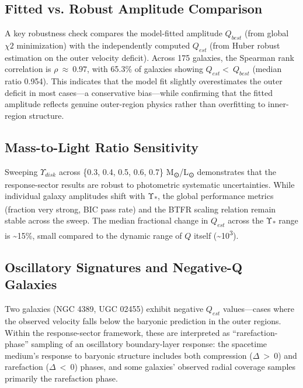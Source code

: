 \documentclass[11pt]{article}
\begin{document}
\subsection{Fitted vs. Robust Amplitude Comparison}\label{fitted-vs.-robust-amplitude-comparison}

A key robustness check compares the model-fitted amplitude \(Q_{best}\) (from global \(\chi 2\) minimization) with the independently computed \(Q_{est}\) (from Huber robust estimation on the outer velocity deficit). Across 175 galaxies, the Spearman rank correlation is \(\rho\  \approx \ 0.97\), with 65.3\% of galaxies showing \(Q_{est} < \ Q_{best}\) (median ratio 0.954). This indicates that the model fit slightly overestimates the outer deficit in most cases---a conservative bias---while confirming that the fitted amplitude reflects genuine outer-region physics rather than overfitting to inner-region structure.

\subsection{Mass-to-Light Ratio Sensitivity}\label{mass-to-light-ratio-sensitivity}

Sweeping \(\Upsilon_{disk}\) across \{0.3, 0.4, 0.5, 0.6, 0.7\} M\textsubscript{⊙}/L\textsubscript{⊙} demonstrates that the response-sector results are robust to photometric systematic uncertainties. While individual galaxy amplitudes shift with Υ\textsubscript{*}, the global performance metrics (fraction very strong, BIC pass rate) and the BTFR scaling relation remain stable across the sweep. The median fractional change in \(Q_{est}\) across the Υ\textsubscript{*} range is \textasciitilde15\%, small compared to the dynamic range of \(Q\) itself (\textasciitilde10\textsuperscript{3}).

\subsection{Oscillatory Signatures and Negative-Q Galaxies}\label{oscillatory-signatures-and-negative-q-galaxies}

Two galaxies (NGC 4389, UGC 02455) exhibit negative \(Q_{est}\) values---cases where the observed velocity falls below the baryonic prediction in the outer regions. Within the response-sector framework, these are interpreted as ``rarefaction-phase'' sampling of an oscillatory boundary-layer response: the spacetime medium's response to baryonic structure includes both compression (\(\Delta\  > \ 0\)) and rarefaction (\(\Delta\  < \ 0\)) phases, and some galaxies' observed radial coverage samples primarily the rarefaction phase.
\end{document}
